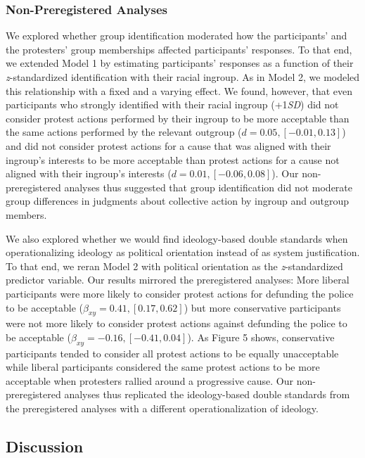 \documentclass[12pt, letterpaper]{article}
\begin{document}
\hypertarget{non-preregistered-analyses-1}{%
\subsubsection{Non-Preregistered
Analyses}\label{non-preregistered-analyses-1}}

We explored whether group identification moderated how the participants'
and the protesters' group memberships affected participants' responses.
To that end, we extended Model 1 by estimating participants' responses
as a function of their \emph{z}-standardized identification with their
racial ingroup. As in Model 2, we modeled this relationship with a fixed
and a varying effect. We found, however, that even participants who
strongly identified with their racial ingroup (+1\emph{SD}) did not
consider protest actions performed by their ingroup to be more
acceptable than the same actions performed by the relevant outgroup
(\(d = 0.05, [-0.01, 0.13]\)) and did not consider protest actions for a
cause that was aligned with their ingroup's interests to be more
acceptable than protest actions for a cause not aligned with their
ingroup's interests (\(d = 0.01, [-0.06, 0.08]\)). Our non-preregistered
analyses thus suggested that group identification did not moderate group
differences in judgments about collective action by ingroup and outgroup
members.

We also explored whether we would find ideology-based double standards
when operationalizing ideology as political orientation instead of as
system justification. To that end, we reran Model 2 with political
orientation as the \emph{z}-standardized predictor variable. Our results
mirrored the preregistered analyses: More liberal participants were more
likely to consider protest actions for defunding the police to be
acceptable (\(\beta_{xy} = 0.41, [0.17, 0.62]\)) but more conservative
participants were not more likely to consider protest actions against
defunding the police to be acceptable
(\(\beta_{xy} = -0.16, [-0.41, 0.04]\)). As Figure 5 shows, conservative
participants tended to consider all protest actions to be equally
unacceptable while liberal participants considered the same protest
actions to be more acceptable when protesters rallied around a
progressive cause. Our non-preregistered analyses thus replicated the
ideology-based double standards from the preregistered analyses with a
different operationalization of ideology.

\hypertarget{discussion-1}{%
\subsection{Discussion}\label{discussion-1}}
\end{document}
